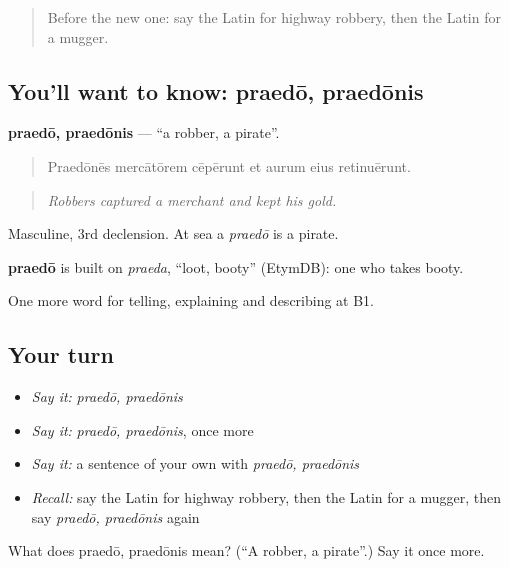 \begin{quote}
Before the new one: say the Latin for highway robbery, then the Latin for a mugger.
\end{quote}

\subsection*{You'll want to know: praedō, praedōnis}
\textbf{praedō, praedōnis} — \textquotedblleft{}a robber, a pirate\textquotedblright{}.

\begin{quote}
Praedōnēs mercātōrem cēpērunt et aurum eius retinuērunt.
\end{quote}

\begin{quote}
\emph{Robbers captured a merchant and kept his gold.}
\end{quote}

Masculine, 3rd declension. At sea a \emph{praedō} is a pirate.

\begin{cousinweb}
\textbf{praedō} is built on \emph{praeda}, \textquotedblleft{}loot, booty\textquotedblright{} (EtymDB): one who takes booty.
\end{cousinweb}

\begin{grammarlens}[title={What you've built}]
One more word for telling, explaining and describing at B1.
\end{grammarlens}

\subsection*{Your turn}
\begin{itemize}
\raggedright
  \item \emph{Say it:} \emph{praedō, praedōnis}
  \item \emph{Say it:} \emph{praedō, praedōnis}, once more
  \item \emph{Say it:} a sentence of your own with \emph{praedō, praedōnis}
  \item \emph{Recall:} say the Latin for highway robbery, then the Latin for a mugger, then say \emph{praedō, praedōnis} again
\end{itemize}

\begin{tcolorbox}[breakable,colback=teal!4,colframe=teal!35!black,title={Before you move on}]
What does praedō, praedōnis mean? (\textquotedblleft{}A robber, a pirate\textquotedblright{}.) Say it once more.
\end{tcolorbox}
